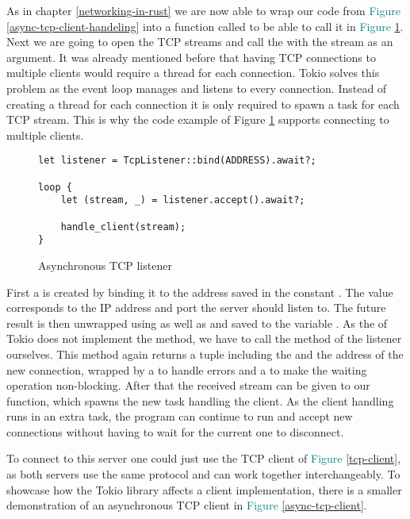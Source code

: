 As in chapter \ref{networking-in-rust} we are now able to wrap our code from
\textcolor{teal}{Figure \ref{async-tcp-client-handeling}} into a function called  to be able to
call it in \textcolor{teal}{Figure \ref{async-tcp-listener}}. Next we are going to open the TCP streams and call the
 with the stream as an argument. It was already mentioned before that having TCP connections to
multiple clients would require a thread for each connection. Tokio solves this problem as the event loop manages and
listens to every connection. Instead of creating a thread for each connection it is only required to spawn a task for
each TCP stream. This is why the code example of Figure \textcolor{teal}{\ref{async-tcp-listener}} supports connecting
to multiple clients.

\begin{figure}[ht]
    \begin{verbatim}
let listener = TcpListener::bind(ADDRESS).await?;

loop {
    let (stream, _) = listener.accept().await?;

    handle_client(stream);
}
    \end{verbatim}
    \caption{Asynchronous TCP listener}
    \label{async-tcp-listener}
\end{figure}

First a  is created by binding it to the address saved in the  constant
. The value corresponds to the IP address and port the server should listen to. The future result is
then unwrapped using  as well as  and saved to the variable . As the
 of Tokio does not implement the  method, we have to call the  method of
the listener ourselves. This method again returns a tuple including the  and the address of the new
connection, wrapped by a  to handle errors and a  to make the waiting operation non-blocking.
After that the received stream can be given to our  function, which spawns the new task handling
the client. As the client handling runs in an extra task, the program can continue to run and accept new connections
without having to wait for the current one to disconnect.

To connect to this server one could just use the TCP client of \textcolor{teal}{Figure \ref{tcp-client}}, as both
servers use the same protocol and can work together interchangeably. To showcase how the Tokio library affects a client
implementation, there is a smaller demonstration of an asynchronous TCP client in
\textcolor{teal}{Figure \ref{async-tcp-client}}.

